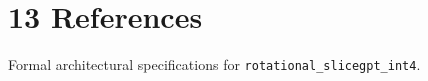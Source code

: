 \section{13 References}

Formal architectural specifications for \texttt{rotational_slicegpt_int4}.
